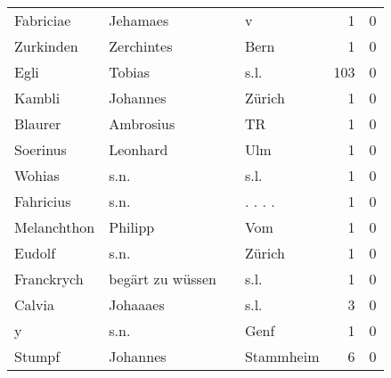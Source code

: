 \documentclass[10pt,a4paper,landscape]{article}
\begin{document}
\begin{longtable}{llllrr}
                Fabriciae &                           Jehamaes &             &                                           v &          1 &         0 \\
                Zurkinden &                         Zerchintes &             &                                        Bern &          1 &         0 \\
                     Egli &                             Tobias &             &                                        s.l. &        103 &         0 \\
                   Kambli &                           Johannes &             &                                      Zürich &          1 &         0 \\
                  Blaurer &                          Ambrosius &             &                                          TR &          1 &         0 \\
                 Soerinus &                           Leonhard &             &                                         Ulm &          1 &         0 \\
                   Wohias &                               s.n. &             &                                        s.l. &          1 &         0 \\
                Fahricius &                               s.n. &             &                                    . . . .  &          1 &         0 \\
              Melanchthon &                            Philipp &             &                                         Vom &          1 &         0 \\
                   Eudolf &                               s.n. &             &                                      Zürich &          1 &         0 \\
               Franckrych &                   begärt zu wüssen &             &                                        s.l. &          1 &         0 \\
                   Calvia &                           Johaaaes &             &                                        s.l. &          3 &         0 \\
                        y &                               s.n. &             &                                        Genf &          1 &         0 \\
                   Stumpf &                           Johannes &             &                                   Stammheim &          6 &         0 \\

\end{longtable}
\end{document}
